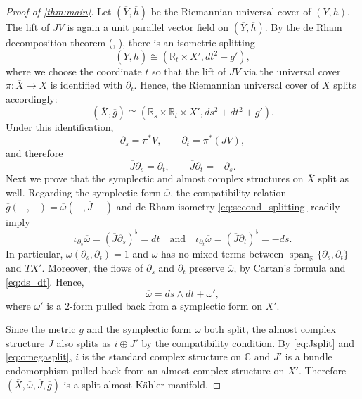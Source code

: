 \documentclass[11pt,twoside]{amsart}
\newcommand{\R}{\mathbb{R}}
\newcommand{\C}{\mathbb{C}}
\newcommand{\qand}{\quad\text{and}\quad}
\begin{document}
\begin{proof}[Proof of \autoref{thm:main}]
    Let $(\overline{Y},\overline{h})$ be the Riemannian universal cover of $(Y,h)$. The lift of $JV$ is again a unit parallel vector field on $(\overline Y,\overline h)$. By the de Rham decomposition theorem (\cite{deRham1952}, \cite[Theorem 10.3.1]{Petersen2016}), there is an isometric splitting 
    \[(\overline{Y},\overline{h})\cong(\R_t\times X',dt^2+g'),\]
    where we choose the coordinate $t$ so that the lift of $JV$ via the universal cover $\pi \colon \overline X \to X$ is identified with $\partial_t$.
   Hence, the Riemannian universal cover of $X$ splits accordingly:
    \begin{equation}\label{eq:second_splitting}
        (\overline X, \overline g) \cong (\R_s\times\R_t \times  X', ds^2 + dt^2 + g').
    \end{equation}
   Under this identification, 
   \[ \partial_s=\pi^*V, \qquad \partial_t=\pi^*(JV), \] and therefore \begin{equation}\label{eq:Jsplit}
       \overline J\partial_s=\partial_t, \qquad \overline J\partial_t=-\partial_s.
   \end{equation}  
    Next we prove that the symplectic and almost complex structures on $\overline X$ split as well. Regarding the symplectic form $\overline \omega$, the compatibility relation $\overline g(-,-) = \overline \omega(-,\overline J-)$ and de Rham isometry \eqref{eq:second_splitting} readily imply
    \begin{equation}\label{eq:ds_dt}
        \iota_{\partial_s}\overline \omega = (\overline{J}\partial_s)^\flat = dt \qand \iota_{\partial_t} \overline \omega = (\overline{J}\partial_t)^\flat = - ds.
    \end{equation}
    In particular, $\overline \omega(\partial_s, \partial_t) = 1$  and $\overline\omega$ has no mixed terms between $\operatorname{span}_{\mathbb R}\{\partial_s,\partial_t\}$ and $TX'$. Moreover, the flows of $\partial_s$ and $\partial_t$ preserve $\overline \omega$, by Cartan's formula and \eqref{eq:ds_dt}. Hence, 
    \begin{equation}\label{eq:omegasplit}
        \overline \omega = ds \wedge dt + \omega', 
    \end{equation} 
    where $\omega'$ is a $2$-form pulled back from a symplectic form on $X'$. 

    Since the metric $\overline{g}$ and the symplectic form $\overline{\omega}$ both split, the almost complex structure $\overline{J}$ also splits as $i\oplus J'$ by the compatibility condition. By \eqref{eq:Jsplit} and \eqref{eq:omegasplit}, $i$ is the standard complex structure on $\C$ and $J'$ is a bundle endomorphism pulled back from an almost complex structure on $X'$. Therefore $(\overline X, \overline \omega, \overline J, \overline g)$ is a split almost K\"ahler manifold.
\end{proof}
\end{document}
